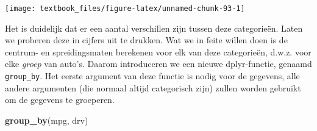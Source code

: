\documentclass[]{tufte-book}
\newenvironment{Shaded}{}{}
\newcommand{\DataTypeTok}[1]{\textcolor[rgb]{0.56,0.13,0.00}{#1}}
\newcommand{\DecValTok}[1]{\textcolor[rgb]{0.25,0.63,0.44}{#1}}
\newcommand{\FloatTok}[1]{\textcolor[rgb]{0.25,0.63,0.44}{#1}}
\newcommand{\KeywordTok}[1]{\textcolor[rgb]{0.00,0.44,0.13}{\textbf{#1}}}
\newcommand{\NormalTok}[1]{#1}
\newcommand{\OperatorTok}[1]{\textcolor[rgb]{0.40,0.40,0.40}{#1}}
\newcommand{\StringTok}[1]{\textcolor[rgb]{0.25,0.44,0.63}{#1}}
\begin{document}
\begin{Shaded}
\end{Shaded}

\texttt{[image: textbook\_files/figure-latex/unnamed-chunk-93-1]}

Het is duidelijk dat er een aantal verschillen zijn tussen deze categorieën. Laten we proberen deze in cijfers uit te drukken. Wat we in feite willen doen is de centrum- en spreidingsmaten berekenen voor elk van deze categorieën, d.w.z. voor elke \emph{groep} van auto's. Daarom introduceren we een nieuwe dplyr-functie, genaamd \texttt{group\_by}. Het eerste argument van deze functie is nodig voor de gegevens, alle andere argumenten (die normaal altijd categorisch zijn) zullen worden gebruikt om de gegevens te groeperen.

\begin{Shaded}
\begin{Highlighting}[]
\KeywordTok{group_by}\NormalTok{(mpg, drv)}
\end{Highlighting}
\end{Shaded}
\end{document}
